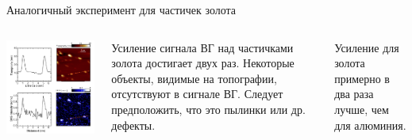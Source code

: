 \documentclass[9pt, compress, xcolor=table]{beamer}
\begin{document}
\begin{frame}{Аналогичный эксперимент для частичек золота}
\begin{columns}
\column{7cm}
\begin{center}
\includegraphics[width=\textwidth]{shg10}
\end{center}
\column{5cm}
Усиление сигнала ВГ над частичками золота достигает двух раз. Некоторые объекты, видимые на топографии, отсутствуют в сигнале ВГ. Следует предположить, что это пылинки или др. дефекты.

Усиление для золота примерно в два раза лучше, чем для алюминия.
\end{columns}
\end{frame}
\end{document}
